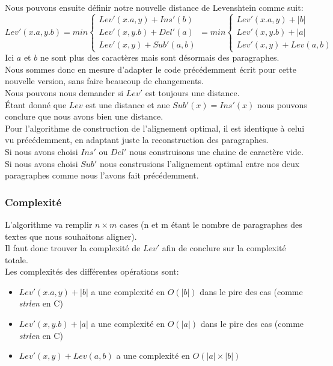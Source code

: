 \documentclass{article}
\begin{document}
Nous pouvons ensuite définir notre nouvelle distance de Levenshtein comme suit:
\begin{equation*}
	Lev'(x.a,y.b)= min
		\begin{cases}
			Lev'(x.a,y) + Ins'(b)\\
			Lev'(x,y.b) + Del'(a)\\
			Lev'(x,y) + Sub'(a,b)
		\end{cases}
		= min
		\begin{cases}
			Lev'(x.a,y) + \lvert b \rvert\\
			Lev'(x,y.b) + \lvert a \rvert\\
			Lev'(x,y) + Lev(a,b)
		\end{cases}
\end{equation*}
Ici $a$ et $b$ ne sont plus des caractères mais sont désormais des
paragraphes.\\
Nous sommes donc en mesure d'adapter le code précédemment écrit pour cette
nouvelle version, sans faire beaucoup de changements.\\

Nous pouvons nous demander si $Lev'$ est toujours une distance.\\
Étant donné que $Lev$ est une distance et aue $Sub'(x)=Ins'(x)$ nous pouvons
conclure que nous avons bien une distance.\\


Pour l'algorithme de construction de l'alignement optimal, il est identique à
celui vu précédemment, en adaptant juste la reconstruction des paragraphes.\\
Si nous avons choisi $Ins'$ ou $Del'$ nous construisons une chaine de caractère
vide.\\
Si nous avons choisi $Sub'$ nous construsions l'alignement optimal entre nos
deux paragraphes comme nous l'avons fait précédemment.

\subsubsection{Complexité}

L'algorithme va remplir $n \times m$ cases (n et m étant le nombre de
paragraphes des textes que nous souhaitons aligner).\\
Il faut donc trouver la complexité de $Lev'$ afin de conclure sur la complexité
totale.\\
Les complexités des différentes opérations sont:
\begin{itemize}
	\item $Lev'(x.a,y) + \lvert b \rvert$ a une complexité en $O(\lvert b
		\rvert)$ dans le pire des cas (comme \textit{strlen} en C) 
	\item $Lev'(x,y.b) + \lvert a \rvert$ a une complexité en $O(\lvert a
		\rvert)$ dans le pire des cas (comme \textit{strlen} en C) 
	\item $Lev'(x,y) + Lev(a,b)$ a une complexité en $O( \lvert a \rvert \times
		\lvert b \rvert)$
\end{itemize}
\end{document}
